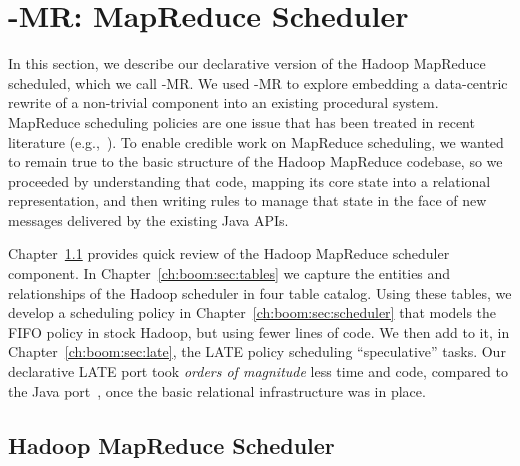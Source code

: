 
\section{\BOOM-MR: MapReduce Scheduler}
\label{ch:boom:sec:port}

In this section, we describe our declarative version of the Hadoop MapReduce
scheduled, which we call \BOOM-MR.  We used \BOOM-MR to explore embedding a
data-centric rewrite of a non-trivial component into an existing procedural
system.  MapReduce scheduling policies are one issue that has been treated in
recent literature (e.g.,~\cite{zaharia-late,delay-sched}).  To enable credible
work on MapReduce scheduling, we wanted to remain true to the basic structure
of the Hadoop MapReduce codebase, so we proceeded by understanding that code,
mapping its core state into a relational representation, and then writing
\OVERLOG rules to manage that state in the face of new messages delivered by
the existing Java APIs.  

Chapter~\ref{ch:boom:sec:hadoop} provides quick review of the Hadoop MapReduce
scheduler component.  In Chapter~\ref{ch:boom:sec:tables} we capture the
entities and relationships of the Hadoop scheduler in four table catalog.
Using these tables, we develop a scheduling policy in
Chapter~\ref{ch:boom:sec:scheduler} that models the FIFO policy in stock
Hadoop, but using fewer lines of code.  We then add to it, in
Chapter~\ref{ch:boom:sec:late}, the LATE policy scheduling ``speculative''
tasks.  Our declarative LATE port took {\em orders of magnitude} less time and
code, compared to the Java port~\cite{jira-2141}, once the basic relational
infrastructure was in place.

\subsection{Hadoop MapReduce Scheduler}
\label{ch:boom:sec:hadoop}


